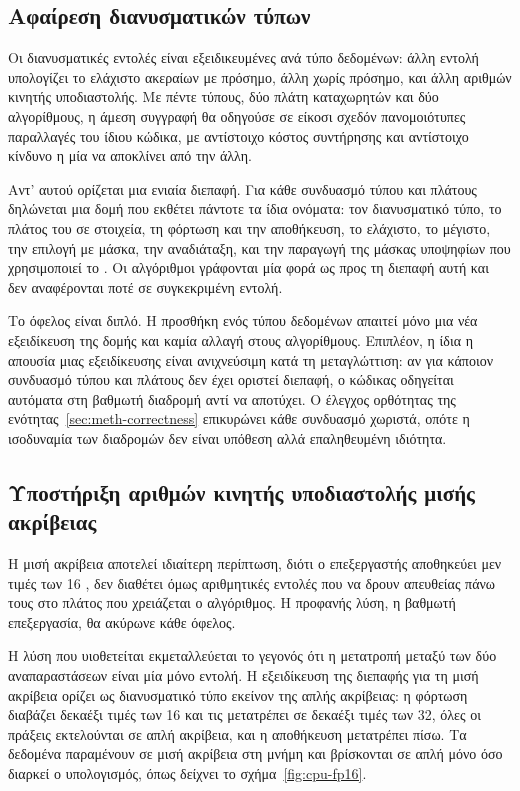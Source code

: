 \subsection{Αφαίρεση διανυσματικών τύπων}
\label{sec:cpu-simd-traits}

Οι διανυσματικές εντολές είναι εξειδικευμένες ανά τύπο δεδομένων: άλλη εντολή
υπολογίζει το ελάχιστο ακεραίων με πρόσημο, άλλη χωρίς πρόσημο, και άλλη αριθμών
κινητής υποδιαστολής. Με πέντε τύπους, δύο πλάτη καταχωρητών και δύο
αλγορίθμους, η άμεση συγγραφή θα οδηγούσε σε είκοσι σχεδόν πανομοιότυπες
παραλλαγές του ίδιου κώδικα, με αντίστοιχο κόστος συντήρησης και αντίστοιχο
κίνδυνο η μία να αποκλίνει από την άλλη.

Αντ' αυτού ορίζεται μια ενιαία διεπαφή. Για κάθε συνδυασμό τύπου και πλάτους
δηλώνεται μια δομή που εκθέτει πάντοτε τα ίδια ονόματα: τον διανυσματικό τύπο,
το πλάτος του σε στοιχεία, τη φόρτωση και την αποθήκευση, το ελάχιστο, το
μέγιστο, την επιλογή με μάσκα, την αναδιάταξη, και την παραγωγή της μάσκας
υποψηφίων που χρησιμοποιεί το . Οι αλγόριθμοι γράφονται μία φορά
ως προς τη διεπαφή αυτή και δεν αναφέρονται ποτέ σε συγκεκριμένη εντολή.

Το όφελος είναι διπλό. Η προσθήκη ενός τύπου δεδομένων απαιτεί μόνο μια νέα
εξειδίκευση της δομής και καμία αλλαγή στους αλγορίθμους. Επιπλέον, η ίδια η
απουσία μιας εξειδίκευσης είναι ανιχνεύσιμη κατά τη μεταγλώττιση: αν για κάποιον
συνδυασμό τύπου και πλάτους δεν έχει οριστεί διεπαφή, ο κώδικας οδηγείται
αυτόματα στη βαθμωτή διαδρομή αντί να αποτύχει. Ο έλεγχος ορθότητας της
ενότητας~\ref{sec:meth-correctness} επικυρώνει κάθε συνδυασμό χωριστά, οπότε η
ισοδυναμία των διαδρομών δεν είναι υπόθεση αλλά επαληθευμένη ιδιότητα.

\subsection{Υποστήριξη αριθμών κινητής υποδιαστολής μισής ακρίβειας}
\label{sec:cpu-fp16}

Η μισή ακρίβεια αποτελεί ιδιαίτερη περίπτωση, διότι ο επεξεργαστής αποθηκεύει
μεν τιμές των 16 , δεν διαθέτει όμως αριθμητικές εντολές που να δρουν
απευθείας πάνω τους στο πλάτος που χρειάζεται ο αλγόριθμος. Η προφανής λύση, η
βαθμωτή επεξεργασία, θα ακύρωνε κάθε όφελος.

Η λύση που υιοθετείται εκμεταλλεύεται το γεγονός ότι η μετατροπή μεταξύ των δύο
αναπαραστάσεων είναι μία μόνο εντολή. Η εξειδίκευση της διεπαφής για τη μισή
ακρίβεια ορίζει ως διανυσματικό τύπο εκείνον της απλής ακρίβειας: η φόρτωση
διαβάζει δεκαέξι τιμές των 16  και τις μετατρέπει σε δεκαέξι τιμές των
32, όλες οι πράξεις εκτελούνται σε απλή ακρίβεια, και η αποθήκευση μετατρέπει
πίσω. Τα δεδομένα παραμένουν σε μισή ακρίβεια στη μνήμη και βρίσκονται σε απλή
μόνο όσο διαρκεί ο υπολογισμός, όπως δείχνει το σχήμα~\ref{fig:cpu-fp16}.

